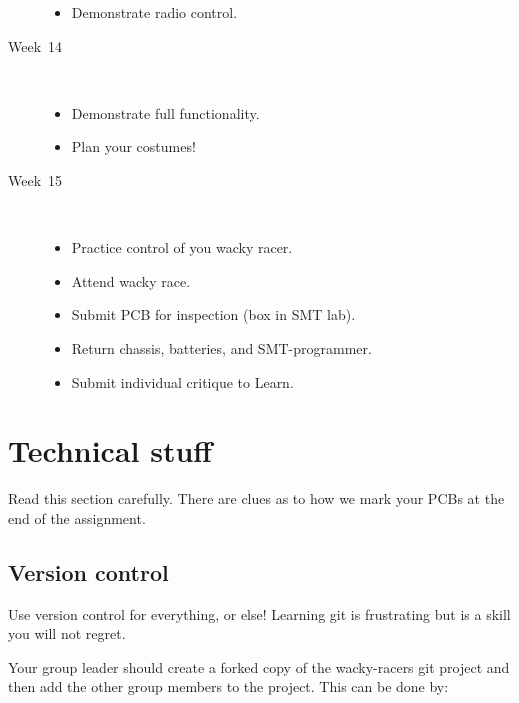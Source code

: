 \documentclass[11pt, a4paper]{article}
\begin{document}
\begin{description}
  \begin{itemize}
  \item Demonstrate radio control.
  \end{itemize}

\item [Week~14]\mbox{}\\

  \begin{itemize}
  \item Demonstrate full functionality.
  \item Plan your costumes!
  \end{itemize}

\item [Week~15]\mbox{}\\

  \begin{itemize}
  \item Practice control of you wacky racer.
  \item Attend wacky race.
  \item Submit PCB for inspection (box in SMT lab).
  \item Return chassis, batteries, and SMT-programmer.
  \item Submit individual critique to Learn.
  \end{itemize}

\end{description}



\section{Technical stuff}

Read this section carefully.  There are clues as to how we mark your PCBs at the
end of the assignment.

\subsection{Version control}

Use version control for everything, or else!  Learning git is frustrating but is
a skill you will not regret.

Your group leader should create a forked copy of the wacky-racers git project
and then add the other group members to the project.  This can be done by:
\end{document}
